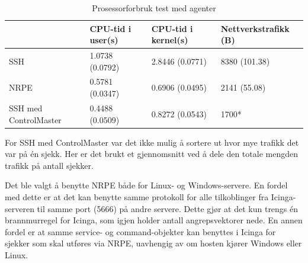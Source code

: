 \begin{table}
    \begin{center}
	\begin{threeparttable}
    \begin{tabular}{| l | l | l | l |} \hline
	\ & \textbf{CPU-tid i user(s)} & \textbf{CPU-tid i kernel(s)} & \textbf{Nettverkstrafikk (B)} \\ \hline
	SSH & 1.0738 (0.0792) & 2.8446 (0.0771) & 8380 (101.38) \\ \hline
	NRPE & 0.5781 (0.0347) & 0.6906 (0.0495) & 2141 (55.08) \\ \hline
	SSH med ControlMaster & 0.4488 (0.0509) & 0.8272 (0.0543) & 1700* \\ \hline
	\end{tabular}
	\begin{tablenotes}
	\small
	\item *For SSH med ControlMaster var det ikke mulig å sortere ut hvor mye trafikk det var på én sjekk. Her er det brukt et gjennomsnitt ved å dele den totale mengden trafikk på antall sjekker.
	\end{tablenotes}
	\caption{Prosessorforbruk test med agenter}
	\label{agentcheck}
	\end{threeparttable}
	\end{center}
\end{table}

Det ble valgt å benytte NRPE både for Linux- og Windows-servere. En fordel med dette er at det kan benytte samme protokoll for alle tilkoblinger fra Icinga-serveren til samme port (5666) på andre servere. Dette gjør at det kun trengs én brannmurregel for Icinga, som igjen holder antall angrepsvektorer nede. En annen fordel er at samme service- og command-objekter kan benyttes i Icinga for sjekker som skal utføres via NRPE, uavhengig av om hosten kjører Windows eller Linux.


